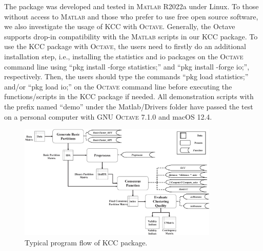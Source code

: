 \documentclass[10pt]{acmtrans2e}
\newcommand{\Matlab}{\textsc{Matlab}}
\newcommand{\Octave}{\textsc{Octave}}
\newcommand{\package}[1]{\textsf{#1}\xspace} %
\begin{document}
The package was developed and tested in \Matlab{} R2022a under Linux. To those without access to \Matlab{} and those who prefer to use free open source software, we also investigate the usage of \package{KCC} with \Octave{}. Generally, the Octave supports drop-in compatibility with the \Matlab{} scripts in our \package{KCC} package. To use the \package{KCC} package with \Octave{}, the users need to firstly do an additional installation step, i.e., installing the statistics and io packages on the \Octave{} command line using ``pkg install -forge statistics;'' and ``pkg install -forge io;'', respectively. Then, the users should type the commands ``pkg load statistics;'' and/or ``pkg load io;'' on the \Octave{} command line before executing the functions/scripts in the KCC package if needed. All demonstration scripts with the prefix named ``demo'' under the \textsf{Matlab/Drivers} folder have passed the test on a personal computer with GNU \Octave{} 7.1.0 and macOS 12.4.

\begin{figure}[!bt]
\centering
\includegraphics[width=0.85\textwidth]{fig/soft.eps}
\caption{Typical program flow of \package{KCC} package.}\label{fig:soft} %
\end{figure}

\end{document}

